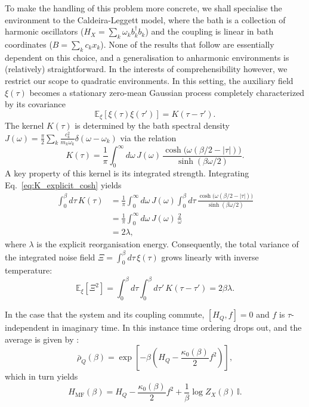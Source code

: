  To make the handling of this problem more concrete, we shall specialise the environment to the Caldeira-Leggett model, where the bath is a collection of harmonic oscillators ($H_X=\sum_k \omega_k b_k^\dagger b_k$) and the coupling is linear in bath coordinates ($B=\sum_k c_k x_k$). None of the results that follow are essentially dependent on this choice, and a generalisation to anharmonic environments is (relatively) straightforward.  In the interests of comprehensibility however, we restrict our scope to quadratic environments. In this setting, the auxiliary field $\xi(\tau)$ becomes a stationary zero-mean Gaussian process completely characterized by its covariance
\begin{equation}
    \mathbb E_\xi[\xi(\tau)\xi(\tau')] = K(\tau-\tau').
\end{equation}
The kernel $K(\tau)$ is determined by the bath spectral density $J(\omega)=\frac{\pi}{2}\sum_k \frac{c_k^2}{m_k\omega_k}\delta(\omega-\omega_k)$ via the relation~\cite{weissQuantumDissipativeSystems2012}
\begin{equation}
    K(\tau)=\frac{1}{\pi}\int_0^\infty d\omega\,J(\omega)\,
    \frac{\cosh\!\big(\omega(\beta/2-|\tau|)\big)}{\sinh(\beta\omega/2)}.
    \label{eq:K_explicit_cosh}
\end{equation}
A key property of this kernel is its integrated strength. Integrating Eq.~\eqref{eq:K_explicit_cosh} yields
\begin{align}
    \int_0^\beta d\tau\,K(\tau) 
    &= \frac{1}{\pi}\int_0^\infty \!\!d\omega\,J(\omega) \int_0^\beta d\tau\, \frac{\cosh\!\big(\omega(\beta/2-|\tau|)\big)}{\sinh(\beta\omega/2)} \nonumber\\
    &= \frac{1}{\pi}\int_0^\infty \!\!d\omega\,J(\omega)\,\frac{2}{\omega} \nonumber\\
    &= 2\lambda,
    \label{eq:int_K_2lambda}
\end{align}
where $\lambda$ is the explicit reorganisation energy. Consequently, the total variance of the integrated noise field $\Xi = \int_0^\beta d\tau\,\xi(\tau)$ grows linearly with inverse temperature:
\begin{equation}
    \mathbb E_\xi[\Xi^2] = \int_0^\beta \!\!d\tau\!\int_0^\beta \!\!d\tau'\,K(\tau-\tau') = 2\beta\lambda.
    \label{eq:integrated_variance_linear}
\end{equation}

In the case that the system and its coupling commute, $[H_Q,f]= 0$ and $f$ is $\tau$-independent in imaginary time. In this instance time ordering drops out, and the average is given by \cite{mccaulMeanForceHamiltoniansInfluence2026}:
\begin{equation}
    \bar{\rho}_Q(\beta)=
    \exp\!\left[-\beta\left(H_Q-\frac{\kappa_0(\beta)}{2}f^2\right)\right],
    \label{eq:rho_commuting_closed_sec3}
\end{equation}
which in turn yields
\begin{equation}
    H_{\mathrm{MF}}(\beta)=
    H_Q-\frac{\kappa_0(\beta)}{2}f^2+\frac{1}{\beta}\log Z_X(\beta)\,\mathbb I.
    \label{eq:Heff_commuting_limit}
\end{equation}

